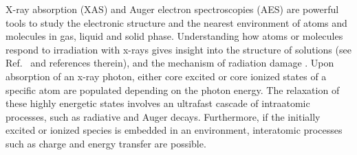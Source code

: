 
X-ray absorption (XAS) and Auger electron spectroscopies (AES) are powerful tools to study the electronic structure and the nearest environment of atoms and molecules in gas, liquid and solid phase. Understanding how atoms or molecules respond to irradiation with x-rays gives insight into the structure of solutions (see Ref.\ \citep{smith17:13909} and references therein), and the mechanism of radiation damage \citep{ONeill02:329,Carugo05:213,Stumpf16:237}. Upon absorption of an x-ray photon, either core excited or core ionized states of a specific atom are populated depending on the photon energy. The relaxation of these highly energetic states involves an ultrafast cascade of intraatomic processes, such as radiative and Auger decays. Furthermore, if the initially excited or ionized species is embedded in an environment, interatomic processes such as charge and energy transfer \citep{Pokapanich09:7264,Pokapanich11:13430,Stumpf16:237,unger17:708,ceolin17:263003} are possible.


